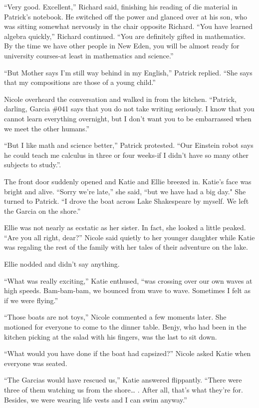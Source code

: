 \documentclass[]{article}
\begin{document}
{“Very good.  Excellent,” Richard said, finishing his reading of die material in Patrick’s notebook.  He switched off the power and glanced over at his son, who was sitting somewhat nervously in the chair opposite Richard.  “You have learned algebra quickly,” Richard continued.  “You are definitely gifted in mathematics.  By the time we have other people in New Eden, you will be almost ready for university courses-at least in mathematics and science.”

“But Mother says I’m still way behind in my English,” Patrick replied.  “She says that my compositions are those of a young child.”

Nicole overheard the conversation and walked in from the kitchen.  “Patrick, darling, Garcia \#041 says that you do not take writing seriously.  I know that you cannot learn everything overnight, but I don’t want you to be embarrassed when we meet the other humans.”

“But I like math and science better,” Patrick protested.  “Our Einstein robot says he could teach me calculus in three or four weeks-if I didn’t have so many other subjects to study.”.

The front door suddenly opened and Katie and Ellie breezed in.  Katie’s face was bright and alive.  “Sorry we’re late,” she said, “but we have had a big day."  She turned to Patrick.  “I drove the boat across Lake Shakespeare by myself.  We left the Garcia on the shore.”

Ellie was not nearly as ecstatic as her sister.  In fact, she looked a little peaked.  “Are you all right, dear?” Nicole said quietly to her younger daughter while Katie was regaling the rest of the family with her tales of their adventure on the lake.

Ellie nodded and didn’t say anything.

“What was really exciting,” Katie enthused, “was crossing over our own waves at high speeds.  Bam-bam-bam, we bounced from wave to wave.  Sometimes I felt as if we were flying.”

“Those boats are not toys,” Nicole commented a few moments later.  She motioned for everyone to come to the dinner table.  Benjy, who had been in the kitchen picking at the salad with his fingers, was the last to sit down.

“What would you have done if the boat had capsized?” Nicole asked Katie when everyone was seated.

“The Garcias would have rescued us,” Katie answered flippantly.  “There were three of them watching us from the shore… .  After all, that’s what they’re for.  Besides, we were wearing life vests and I can swim anyway.”

}
\end{document}
